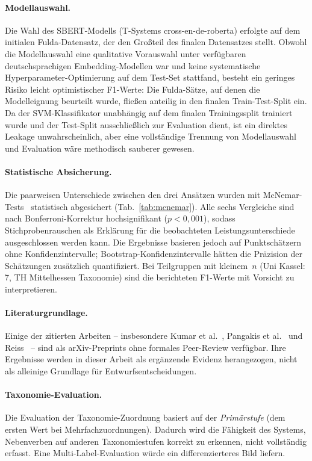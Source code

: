 \paragraph{Modellauswahl.}
Die Wahl des SBERT-Modells (T-Systems cross-en-de-roberta) erfolgte auf dem initialen Fulda-Datensatz, der den Großteil des finalen Datensatzes stellt.
Obwohl die Modellauswahl eine qualitative Vorauswahl unter verfügbaren deutschsprachigen Embedding-Modellen war und keine systematische Hyperparameter-Optimierung auf dem Test-Set stattfand, besteht ein geringes Risiko leicht optimistischer F1-Werte: Die Fulda-Sätze, auf denen die Modelleignung beurteilt wurde, fließen anteilig in den finalen Train-Test-Split ein.
Da der SVM-Klassifikator unabhängig auf dem finalen Trainingssplit trainiert wurde und der Test-Split ausschließlich zur Evaluation dient, ist ein direktes Leakage unwahrscheinlich, aber eine vollständige Trennung von Modellauswahl und Evaluation wäre methodisch sauberer gewesen.

\paragraph{Statistische Absicherung.}
Die paarweisen Unterschiede zwischen den drei Ansätzen wurden mit McNemar-Tests~\cite{mcnemar1947note} statistisch abgesichert (Tab.~\ref{tab:mcnemar}).
Alle sechs Vergleiche sind nach Bonferroni-Korrektur hochsignifikant ($p < 0{,}001$), sodass Stichprobenrauschen als Erklärung für die beobachteten Leistungsunterschiede ausgeschlossen werden kann.
Die Ergebnisse basieren jedoch auf Punktschätzern ohne Konfidenzintervalle; Bootstrap-Konfidenzintervalle hätten die Präzision der Schätzungen zusätzlich quantifiziert.
Bei Teilgruppen mit kleinem~$n$ (Uni Kassel: 7, TH Mittelhessen Taxonomie) sind die berichteten F1-Werte mit Vorsicht zu interpretieren.

\paragraph{Literaturgrundlage.}
Einige der zitierten Arbeiten -- insbesondere Kumar et al.~\cite{kumar2025automated}, Pangakis et al.~\cite{pangakis2023validation} und Reiss~\cite{reiss2023testing} -- sind als arXiv-Preprints ohne formales Peer-Review verfügbar.
Ihre Ergebnisse werden in dieser Arbeit als ergänzende Evidenz herangezogen, nicht als alleinige Grundlage für Entwurfsentscheidungen.

\paragraph{Taxonomie-Evaluation.}
Die Evaluation der Taxonomie-Zuordnung basiert auf der \emph{Primärstufe} (dem ersten Wert bei Mehrfachzuordnungen).
Dadurch wird die Fähigkeit des Systems, Nebenverben auf anderen Taxonomiestufen korrekt zu erkennen, nicht vollständig erfasst.
Eine Multi-Label-Evaluation würde ein differenzierteres Bild liefern.


